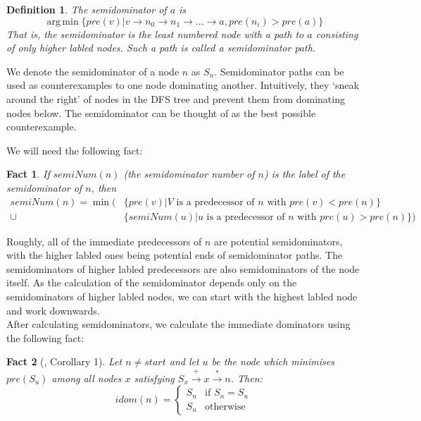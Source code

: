 \documentclass[12pt,a4paper]{article}
\DeclareMathOperator*{\argmin}{arg\,min}
\newtheorem{fact}{Fact}
\newtheorem{definition}{Definition}
\begin{document}
\begin{definition}\label{def:semidominator}
The \emph{semidominator} of $a$ is 
\[
\argmin\{pre(v) | v \to n_0 \to n_1 \to ... \to a, pre(n_i) > pre(a)\}
\]
That is, the semidominator is the least numbered node with a path to $a$
consisting of only higher labled nodes. Such a path is called a \emph{semidominator path.}
\end{definition}
We denote the semidominator of a node $n$ as $S_n$.
Semidominator paths can be used as counterexamples to one node dominating another. Intuitively, they `sneak around the right' of nodes in the DFS tree and prevent them from dominating nodes below. The semidominator can be thought of as the best possible counterexample.

We will need the following fact:
\begin{fact}\label{thm:semidominator}
If $semiNum(n)$ (the \emph{semidominator number} of $n$) is the label of the semidominator of $n$, then
\begin{align*}
semiNum(n) = \min(&\{pre(v) | V \text{ is a predecessor of $n$ with } pre(v) < pre(n)\}\\
\cup &\{semiNum(u) | u \text{ is a predecessor of $n$ with } pre(u) > pre(n)\})
\end{align*}
\end{fact}
Roughly, all of the immediate predecessors of $n$ are potential semidominators, with the higher labled ones being potential ends of semidominator paths. The semidominators of higher labled predecessors are also semidominators of the node itself. As the calculation of the semidominator depends only on the semidominators of higher labled nodes, we can start with the highest labled node and work downwards.\\
After calculating semidominators, we calculate the immediate dominators using the following fact:
\begin{fact}[\cite{lengtarj}, Corollary 1]\label{thm:imdominators}
Let $n \neq start$ and let $u$ be the node which minimises $pre(S_u)$ among all nodes $x$ satisfying $S_x \xrightarrow{+} x \xrightarrow{*} n$. Then:
\[
  idom(n) =
  \begin{cases}
  S_n & \text{if } S_n = S_u\\
  S_u & \text{otherwise}
  \end{cases}
\]
\end{fact}
\end{document}
